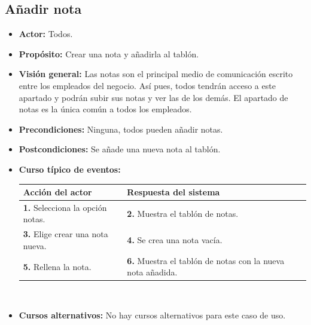 \documentclass[spanish,a4paper,11pt, twoside]{report}	%
\begin{document}
	\subsection{Añadir nota} 
			\begin{itemize}
			\item \textbf{Actor:} Todos.
			\item \textbf{Propósito:} Crear una nota y añadirla al tablón.
			\item \textbf{Visión general:} Las notas son el principal medio de comunicación
				escrito entre los empleados del negocio.   Así pues, todos tendrán acceso a este
				apartado y podrán subir sus notas y ver las de los demás. El apartado de notas es
				la única común a todos los empleados.
			\item \textbf{Precondiciones:} Ninguna, todos pueden añadir notas.
			\item \textbf{Postcondiciones:} Se añade una nueva nota al tablón.
			\item \textbf{Curso típico de eventos:} 	\\
				\begin{tabular}{|p{6cm}||p{6cm}|}
				\hline
				\textbf{Acción del actor} & \textbf{Respuesta del sistema} \\ \hline \hline
				\textbf{1.} Selecciona la opción notas. & 
				\textbf{2.} Muestra el tablón de notas. \\ \hline
				\textbf{3.} Elige crear una nota nueva.	& 
				\textbf{4.} Se crea una nota vacía. \\ \hline
				\textbf{5.} Rellena la nota.	& 
				\textbf{6.} Muestra el tablón de notas con la nueva nota añadida. \\ \hline
			\end{tabular}
			\\
			\item \textbf{Cursos alternativos:} No hay cursos alternativos para este caso de uso.
		\end {itemize}


\end{document}
